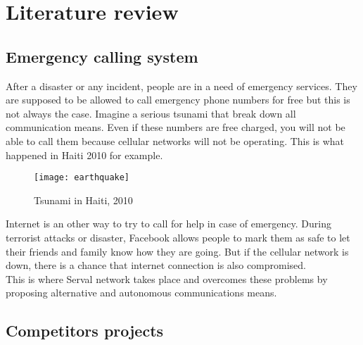 \chapter{Literature review}

\section{Emergency calling system}
After a disaster or any incident, people are in a need of emergency services. They are supposed to be allowed to call emergency phone numbers for free but this is not always the case. Imagine a serious tsunami that break down all communication means. Even if these numbers are free charged, you will not be able to call them because cellular networks will not be operating. This is what happened in Haiti 2010 for example. 

\begin{figure}[h]
\centering
\texttt{[image: earthquake]}
\caption{Tsunami in Haiti, 2010}
\end{figure}

Internet is an other way to try to call for help in case of emergency. During terrorist attacks or disaster, Facebook allows people to mark them as safe to let their friends and family know how they are going. But if the cellular network is down, there is a chance that internet connection is also compromised.\\
This is where Serval network takes place and overcomes these problems by proposing alternative and autonomous communications means.  

\section{Competitors projects}

